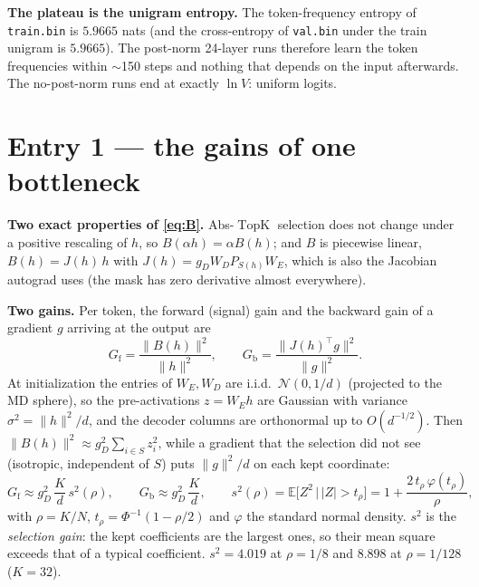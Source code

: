 \documentclass[11pt,a4paper]{article}
\newcommand{\code}[1]{\texttt{#1}}
\newcommand{\Gf}{G_{\mathrm{f}}}
\newcommand{\Gb}{G_{\mathrm{b}}}
\newcommand{\topk}{\operatorname{TopK}}
\begin{document}
\textbf{The plateau is the unigram entropy.}  The token-frequency entropy of
\code{train.bin} is \(5.9665\) nats (and the cross-entropy of \code{val.bin}
under the train unigram is \(5.9665\)).  The post-norm 24-layer runs therefore
learn the token frequencies within \(\sim\)150 steps and nothing that depends on
the input afterwards.  The no-post-norm runs end at exactly \(\ln V\): uniform
logits.

\section{Entry 1 --- the gains of one bottleneck}

\textbf{Two exact properties of \eqref{eq:B}.}  Abs-\(\topk\) selection does not
change under a positive rescaling of \(h\), so \(B(\alpha h)=\alpha B(h)\); and
\(B\) is piecewise linear, \(B(h)=J(h)\,h\) with
\(J(h)=g_D W_D P_{S(h)} W_E\), which is also the Jacobian autograd uses (the mask
has zero derivative almost everywhere).

\textbf{Two gains.}  Per token, the forward (signal) gain and the backward gain
of a gradient \(g\) arriving at the output are
\begin{equation}
  \Gf=\frac{\|B(h)\|^2}{\|h\|^2},\qquad
  \Gb=\frac{\|J(h)^\top g\|^2}{\|g\|^2}.
\end{equation}
At initialization the entries of \(W_E,W_D\) are i.i.d.\ \(\mathcal N(0,1/d)\)
(projected to the MD sphere), so the pre-activations \(z=W_Eh\) are Gaussian with
variance \(\sigma^2=\|h\|^2/d\), and the decoder columns are orthonormal up to
\(O(d^{-1/2})\).  Then \(\|B(h)\|^2\approx g_D^2\sum_{i\in S}z_i^2\), while a
gradient that the selection did not see (isotropic, independent of \(S\)) puts
\(\|g\|^2/d\) on each kept coordinate:
\begin{equation}
  \Gf \approx g_D^2\,\frac{K}{d}\,s^2(\rho),\qquad
  \Gb \approx g_D^2\,\frac{K}{d},\qquad
  s^2(\rho)=\mathbb E\bigl[Z^2\,\big|\,|Z|>t_\rho\bigr]
  = 1+\frac{2\,t_\rho\,\varphi(t_\rho)}{\rho},
  \label{eq:s2}
\end{equation}
with \(\rho=K/N\), \(t_\rho=\Phi^{-1}(1-\rho/2)\) and \(\varphi\) the standard
normal density.  \(s^2\) is the \emph{selection gain}: the kept coefficients are
the largest ones, so their mean square exceeds that of a typical coefficient.
\(s^2 = 4.019\) at \(\rho=1/8\) and \(8.898\) at \(\rho=1/128\) (\(K=32\)).
\end{document}
